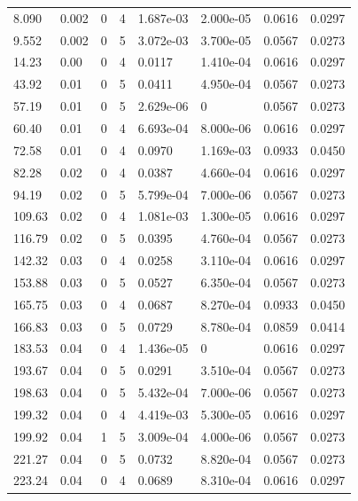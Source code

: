 \documentclass[preview]{standalone}
\begin{document}
{{\begin{tabular}{L{1.2cm}C{1.2cm} C{0.3cm}C{0.5cm} C{1.4cm}C{1.4cm} C{1.4cm}C{1.4cm}}
  8.090  &  0.002  & 0     &  4 &  1.687e-03  & 2.000e-05  & 0.0616 &  0.0297   \\ 
  9.552  &  0.002  & 0     &  5 &  3.072e-03  & 3.700e-05  & 0.0567 &  0.0273   \\ 
  14.23  &  0.00  & 0     &  4 &  0.0117  & 1.410e-04  & 0.0616 &  0.0297   \\ 
  43.92  &  0.01  & 0     &  5 &  0.0411  & 4.950e-04  & 0.0567 &  0.0273   \\ 
  57.19  &  0.01  & 0     &  5 &  2.629e-06  & 0  & 0.0567 &  0.0273   \\ 
  60.40  &  0.01  & 0     &  4 &  6.693e-04  & 8.000e-06  & 0.0616 &  0.0297   \\ 
  72.58  &  0.01  & 0     &  4 &  0.0970  & 1.169e-03  & 0.0933 &  0.0450   \\ 
  82.28  &  0.02  & 0     &  4 &  0.0387  & 4.660e-04  & 0.0616 &  0.0297   \\ 
  94.19  &  0.02  & 0     &  5 &  5.799e-04  & 7.000e-06  & 0.0567 &  0.0273   \\ 
  109.63  &  0.02  & 0     &  4 &  1.081e-03  & 1.300e-05  & 0.0616 &  0.0297   \\ 
  116.79  &  0.02  & 0     &  5 &  0.0395  & 4.760e-04  & 0.0567 &  0.0273   \\ 
  142.32  &  0.03  & 0     &  4 &  0.0258  & 3.110e-04  & 0.0616 &  0.0297   \\ 
  153.88  &  0.03  & 0     &  5 &  0.0527  & 6.350e-04  & 0.0567 &  0.0273   \\ 
  165.75  &  0.03  & 0     &  4 &  0.0687  & 8.270e-04  & 0.0933 &  0.0450   \\ 
  166.83  &  0.03  & 0     &  5 &  0.0729  & 8.780e-04  & 0.0859 &  0.0414   \\ 
  183.53  &  0.04  & 0     &  4 &  1.436e-05  & 0  & 0.0616 &  0.0297   \\ 
  193.67  &  0.04  & 0     &  5 &  0.0291  & 3.510e-04  & 0.0567 &  0.0273   \\ 
  198.63  &  0.04  & 0     &  5 &  5.432e-04  & 7.000e-06  & 0.0567 &  0.0273   \\ 
  199.32  &  0.04  & 0     &  4 &  4.419e-03  & 5.300e-05  & 0.0616 &  0.0297   \\ 
  199.92  &  0.04  & 1     &  5 &  3.009e-04  & 4.000e-06  & 0.0567 &  0.0273   \\ 
  221.27  &  0.04  & 0     &  5 &  0.0732  & 8.820e-04  & 0.0567 &  0.0273   \\ 
  223.24  &  0.04  & 0     &  4 &  0.0689  & 8.310e-04  & 0.0616 &  0.0297   \\ 

\end{tabular}}}
\end{document}
